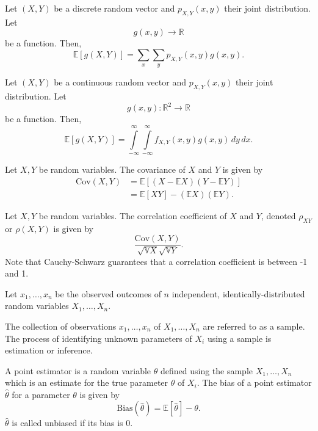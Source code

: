 \documentclass{article}
\begin{document}
\medskip
{}

    Let $(X,Y)$ be a discrete random vector and $p_{X,Y}(x,y)$ their joint distribution. Let $$g(x,y) \to \mathbb R$$ be a function. Then, $$\mathbb E[g(X,Y)] = \sum_x\sum_yp_{X,Y}(x,y)g(x,y).$$

\medskip
{}

    Let $(X,Y)$ be a continuous random vector and $p_{X,Y}(x,y)$ their joint distribution. Let $$g(x,y) : \mathbb R^2 \to \mathbb R$$ be a function. Then, $$\mathbb E[g(X,Y)] = \int\limits_{-\infty}^\infty \int\limits_{-\infty}^\infty f_{X,Y}(x,y)g(x,y)\,dy\,dx.$$

\medskip
{}

    Let $X,Y$ be random variables. The covariance of $X$ and $Y$ is given by
    \begin{align*}
        \text{Cov}(X,Y) &= \mathbb E[(X-\mathbb EX)(Y-\mathbb EY)] \\
                        &= \mathbb E[XY] - (\mathbb EX)(\mathbb EY).
    \end{align*}

\medskip
{}

    Let $X,Y$ be random variables. The correlation coefficient of $X$ and $Y$, denoted $\rho_{XY}$ or $\rho(X,Y)$ is given by $$\frac{\text{Cov}(X,Y)}{\sqrt{\mathbb VX}\sqrt{\mathbb VY}}.$$ Note that Cauchy-Schwarz guarantees that a correlation coefficient is between -1 and 1.

\medskip
{}

    Let $x_1, \hdots, x_n$ be the observed outcomes of $n$ independent, identically-distributed random variables $X_1, \hdots, X_n$.

    The collection of observations $x_1, \hdots, x_n$ of $X_1, \hdots, X_n$ are referred to as a sample. The process of identifying unknown parameters of $X_i$ using a sample is estimation or inference.
 
 \medskip
    
    A point estimator is a random variable $\hat\theta$ defined using the sample $X_1, \hdots, X_n$ which is an estimate for the true parameter $\theta$ of $X_i$. The bias of a point estimator $\hat\theta$ for a parameter $\theta$ is given by $$\text{Bias}(\hat\theta) = \mathbb E[\hat\theta] - \theta.$$ $\hat\theta$ is called unbiased if its bias is 0.
\end{document}
